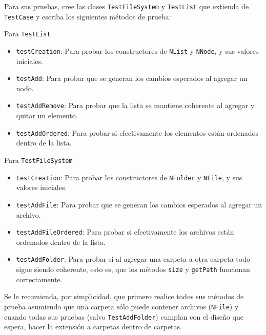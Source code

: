 \documentclass[11pt,spanish,letterpaper]{report}
\begin{document}
Para sus pruebas, cree las clases {\tt TestFileSystem} y {\tt TestList} que extienda de {\tt TestCase} y escriba los siguientes métodos de prueba:

Para {\tt TestList}
\begin{itemize}
	\item {\tt testCreation}: Para probar los constructores de {\tt NList} y {\tt NNode}, y sus valores iniciales.
	\item {\tt testAdd}: Para probar que se generan los cambios esperados al agregar un nodo.
	\item {\tt testAddRemove}: Para probar que la lista se mantiene coherente al agregar y quitar un elemento.
	\item {\tt testAddOrdered}: Para probar si efectivamente los elementos están ordenados dentro de la lista.
\end{itemize}

Para {\tt TestFileSystem}
\begin{itemize}
	\item {\tt testCreation}: Para probar los constructores de {\tt NFolder} y {\tt NFile}, y sus valores iniciales.
	\item {\tt testAddFile}: Para probar que se generan los cambios esperados al agregar un archivo.
	\item {\tt testAddFileOrdered}: Para probar si efectivamente los archivos están ordenados dentro de la lista.
	\item {\tt testAddFolder}: Para probar si al agregar una carpeta a otra carpeta todo sigue siendo coherente, esto es, que los métodos {\tt size} y {\tt getPath} funcionan correctamente.	
\end{itemize}

Se le recomienda, por simplicidad, que primero realice todos sus métodos de prueba asumiendo que una carpeta sólo puede contener archivos ({\tt NFile}) y cuando todas sus pruebas (salvo {\tt TestAddFolder}) cumplan con el diseño que espera, hacer la extensión a carpetas dentro de carpetas.
\end{document}
